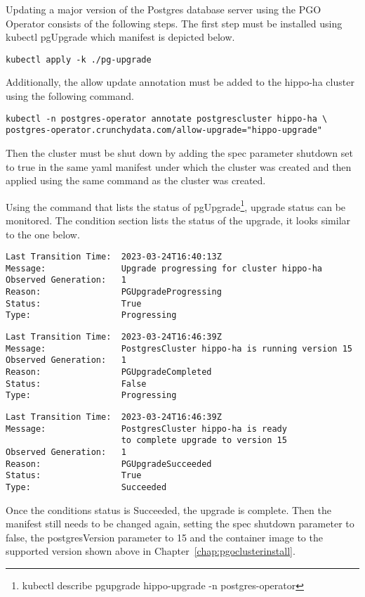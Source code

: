 \label{chap:pgoupdate}
Updating a major version of the Postgres database server using the PGO Operator consists of the following steps. The first step must be installed using kubectl pgUpgrade which manifest is depicted below.
\begin{verbatim}
kubectl apply -k ./pg-upgrade
\end{verbatim}

Additionally, the allow update annotation must be added to the hippo-ha cluster using the following command.
\begin{verbatim}
kubectl -n postgres-operator annotate postgrescluster hippo-ha \
postgres-operator.crunchydata.com/allow-upgrade="hippo-upgrade"
\end{verbatim}


Then the cluster must be shut down by adding the spec parameter shutdown set to true in the same yaml manifest under which the cluster was created and then applied using the same command as the cluster was created.

Using the command that lists the status of pgUpgrade\footnote{kubectl describe pgupgrade hippo-upgrade -n postgres-operator}, upgrade status can be monitored. The condition section lists the status of the upgrade, it looks similar to the one below.

\begin{verbatim}
Last Transition Time:  2023-03-24T16:40:13Z
Message:               Upgrade progressing for cluster hippo-ha
Observed Generation:   1
Reason:                PGUpgradeProgressing
Status:                True
Type:                  Progressing
\end{verbatim}
\begin{verbatim}
Last Transition Time:  2023-03-24T16:46:39Z
Message:               PostgresCluster hippo-ha is running version 15
Observed Generation:   1
Reason:                PGUpgradeCompleted
Status:                False
Type:                  Progressing
\end{verbatim}
\begin{verbatim}
Last Transition Time:  2023-03-24T16:46:39Z
Message:               PostgresCluster hippo-ha is ready 
                       to complete upgrade to version 15
Observed Generation:   1
Reason:                PGUpgradeSucceeded
Status:                True
Type:                  Succeeded
\end{verbatim}

Once the conditions status is Succeeded, the upgrade is complete. Then the manifest still needs to be changed again, setting the spec shutdown parameter to false, the postgresVersion parameter to 15 and the container image to the supported version shown above in Chapter~\ref{chap:pgoclusterinstall}.

